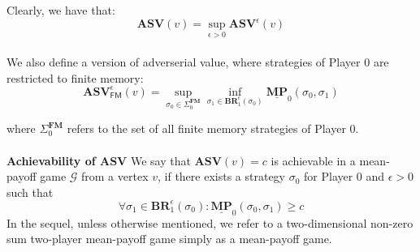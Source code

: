 Clearly, we have that:
\begin{equation*}
    \mathbf{ASV}(v) = \sup\limits_{\epsilon > 0} \mathbf{ASV}^{\epsilon}(v)
\end{equation*}
\\

We also define a version of adverserial value, where strategies of Player 0 are restricted to finite memory:
\begin{equation*}
\mathbf{ASV}^{\epsilon}_\mathsf{FM}(v) = \sup\limits_{\sigma_0 \in \Sigma_0^{\mathbf{FM}}} \inf\limits_{\sigma_1 \in \mathbf{BR}^{\epsilon}_1(\sigma_0)} \underline{\mathbf{MP}}_0(\sigma_0, \sigma_1)
\end{equation*}

where $\Sigma_0^{\mathbf{FM}}$ refers to the set of all finite memory strategies of Player 0.
\\
\\
\noindent\textbf{Achievability of $\mathbf{ASV}$} We say that $\mathbf{ASV}(v) = c$ is achievable in a mean-payoff game $\mathcal{G}$ from a vertex $v$, if there exists a strategy $\sigma_0$ for Player 0 and $\epsilon > 0$ such that
\begin{equation*}
	\forall \sigma_1 \in \mathbf{BR}^{\epsilon}_{1}(\sigma_0) : \underline{\mathbf{MP}}_0(\sigma_0, \sigma_1) \geqslant c
\end{equation*}
In the sequel, unless otherwise mentioned, we refer to a two-dimensional non-zero sum two-player mean-payoff game simply as a mean-payoff game.